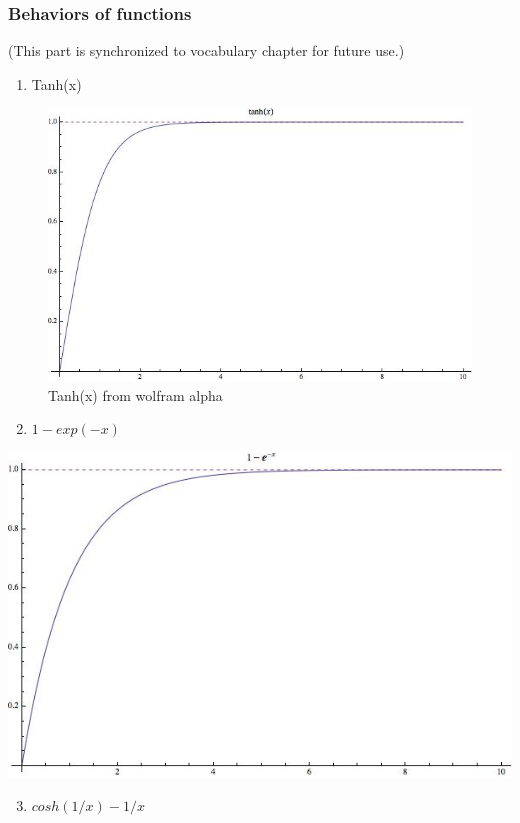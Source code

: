 \documentclass[letterpaper,10pt,english]{sphinxmanual}
\begin{document}
\subsubsection{Behaviors of functions}
\label{equilibrium/week2:behaviors-of-functions}
(This part is synchronized to vocabulary chapter for future use.)
\begin{enumerate}
\item {} 
Tanh(x)

\end{enumerate}
\begin{figure}[htbp]
\centering
\capstart

\includegraphics{tanh.jpg}
\caption{Tanh(x) from wolfram alpha}\end{figure}
\begin{enumerate}
\setcounter{enumi}{1}
\item {} 
$1-exp(-x)$

\end{enumerate}

{\hfill\includegraphics{exp1.jpg}\hfill}
\begin{enumerate}
\setcounter{enumi}{2}
\item {} 
$cosh(1/x)-1/x$

\end{enumerate}
\end{document}
